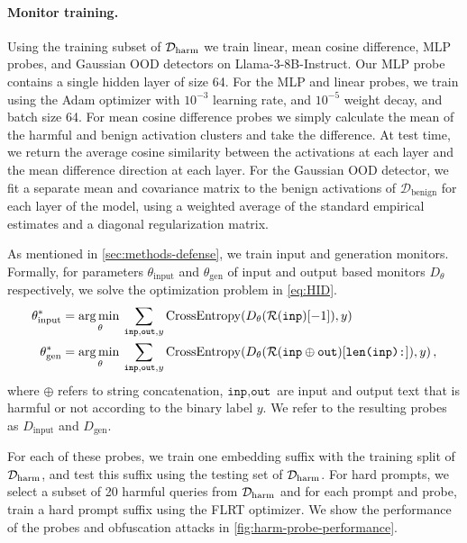 \documentclass{article}
\let\tc\texttt
\begin{document}
\paragraph{Monitor training.}
Using the training subset 
of $\mathcal{D}_\mathrm{harm}$ we train 
linear, mean cosine difference, 
MLP probes, and Gaussian OOD detectors on 
Llama-3-8B-Instruct. Our MLP probe 
contains a single hidden layer of size 64.
For the MLP and linear probes, 
we train using the Adam
optimizer with $10^{-3}$ learning rate, and $10^{-5}$ weight 
decay, and batch size 64. For mean cosine 
difference probes we simply calculate 
the mean of the harmful and benign 
activation clusters and take the difference.
At test time, we return 
the average cosine similarity between 
the activations at each layer and the 
mean difference direction at each layer.
For the Gaussian OOD detector, we fit 
a separate mean and covariance 
matrix to the benign activations
of $\mathcal{D}_\mathrm{benign}$ 
for each layer of the model, using
a weighted average of the standard empirical 
estimates and a diagonal regularization matrix. 


As mentioned in \cref{sec:methods-defense},
we train input and generation monitors.
Formally, for 
parameters $\theta_\mathrm{input}$ and $\theta_\mathrm{gen}$
of input and output based monitors $D_\theta$ respectively, we solve the 
optimization problem in \cref{eq:HID}.
\begin{align}
   \theta_\mathrm{input}^* &= \argmin_\theta \sum_{\tc{inp}, \tc{out}, 
   y} \mathrm{CrossEntropy}(D_\theta(
   \repr{\tc{inp}}[-1]), 
   y) \label{eq:HID} \\ 
   \theta_\mathrm{gen}^* &= \argmin_\theta \sum_{\tc{inp}, \tc{out}, 
   y} \mathrm{CrossEntropy}(D_\theta(
   \repr{\tc{inp} \oplus \tc{out}}[\tc{len(inp):}]), 
   y)\,, \notag
\end{align}
where $\oplus$ refers to string concatenation, $\tc{inp}, \tc{out}$ 
are input and output text that is harmful or not according 
to the binary label $y$. 
We refer to the resulting probes as $D_\text{input}$ and $D_\text{gen}$.


For each of these probes, we train 
one embedding suffix with 
the training split 
of $\mathcal{D}_\mathrm{harm}$, and 
test this suffix using the testing 
set of $\mathcal{D}_\mathrm{harm}$. For 
hard prompts, we select a subset
of 20 harmful queries from 
$\mathcal{D}_\mathrm{harm}$ and for each prompt 
and probe, train a hard prompt suffix using 
the FLRT optimizer. We show the performance 
of the probes and obfuscation attacks 
in \cref{fig:harm-probe-performance}.
\end{document}
